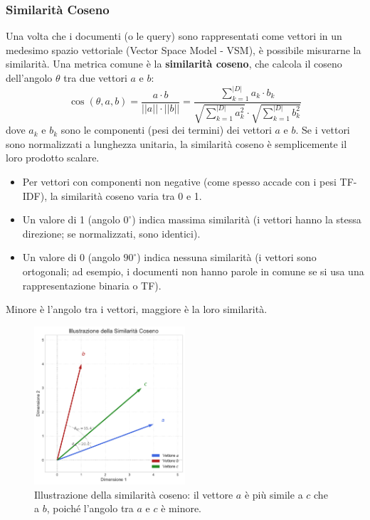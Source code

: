 \documentclass{article}
\begin{document}
\subsubsection{Similarità Coseno}
Una volta che i documenti (o le query) sono rappresentati come vettori in un medesimo spazio vettoriale (Vector Space Model - VSM), è possibile misurarne la similarità. Una metrica comune è la \textbf{similarità coseno}, che calcola il coseno dell'angolo $\theta$ tra due vettori $a$ e $b$:
$$ \cos(\theta, a, b) = \frac{a \cdot b}{||a|| \cdot ||b||} = \frac{\sum_{k=1}^{|D|} a_k \cdot b_k}{\sqrt{\sum_{k=1}^{|D|} a_k^2} \cdot \sqrt{\sum_{k=1}^{|D|} b_k^2}} $$
dove $a_k$ e $b_k$ sono le componenti (pesi dei termini) dei vettori $a$ e $b$.
Se i vettori sono normalizzati a lunghezza unitaria, la similarità coseno è semplicemente il loro prodotto scalare.
\begin{itemize}
    \item Per vettori con componenti non negative (come spesso accade con i pesi TF-IDF), la similarità coseno varia tra 0 e 1.
    \item Un valore di 1 (angolo $0^\circ$) indica massima similarità (i vettori hanno la stessa direzione; se normalizzati, sono identici).
    \item Un valore di 0 (angolo $90^\circ$) indica nessuna similarità (i vettori sono ortogonali; ad esempio, i documenti non hanno parole in comune se si usa una rappresentazione binaria o TF).
\end{itemize}
Minore è l'angolo tra i vettori, maggiore è la loro similarità.

\begin{figure}[H]
    \centering
    \includegraphics[width=0.5\textwidth]{images/cosine_similarity_diagram.pdf}
    \caption{Illustrazione della similarità coseno: il vettore $a$ è più simile a $c$ che a $b$, poiché l'angolo tra $a$ e $c$ è minore.}
    \label{fig:cosine_similarity_diagram}
\end{figure}
\end{document}
